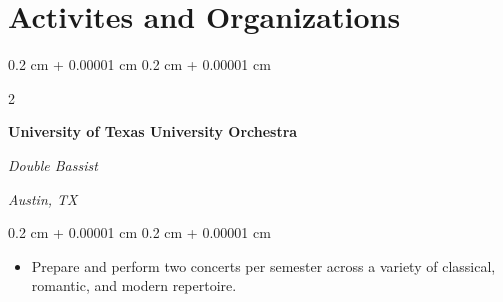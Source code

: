 \documentclass[10pt, letterpaper]{article}
\newenvironment{highlights}{
    \begin{itemize}[
        topsep=0.10 cm,
        parsep=0.10 cm,
        partopsep=0pt,
        itemsep=0pt,
        leftmargin=0.4 cm + 10pt
    ]
}{
    \end{itemize}
} %
\newenvironment{onecolentry}{
    \begin{adjustwidth}{
        0.2 cm + 0.00001 cm
    }{
        0.2 cm + 0.00001 cm
    }
}{
    \end{adjustwidth}
} %
\newenvironment{twocolentry}[2][]{
    \onecolentry
    \def\secondColumn{#2}
    \setcolumnwidth{\fill, 4.5 cm}
    \begin{paracol}{2}
}{
    \switchcolumn \raggedleft \secondColumn
    \end{paracol}
    \endonecolentry
} %
\begin{document}
    
    \section{Activites and Organizations}



        
        \begin{twocolentry}{
        \textit{Austin, TX}    
            
        }
            \textbf{University of Texas University Orchestra}
            
            \textit{Double Bassist}
        \end{twocolentry}

        \vspace{0.10 cm}
        \begin{onecolentry}
            \begin{highlights}
                \item Prepare and perform two concerts per semester across a variety of classical, romantic, and modern repertoire.
            \end{highlights}
        \end{onecolentry}



    
\end{document}
